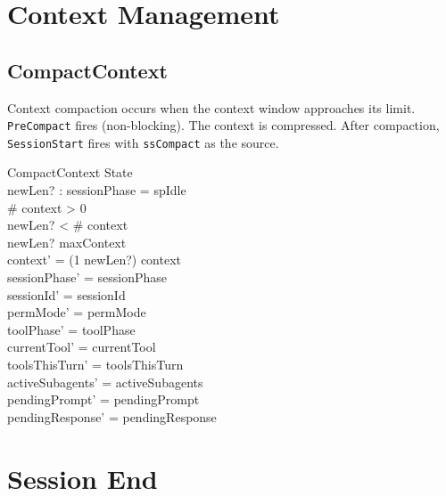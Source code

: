 \documentclass[a4paper,10pt,fleqn]{article}
\begin{document}
\section{Context Management}

\subsection{CompactContext}

Context compaction occurs when the context window approaches its limit.
\texttt{PreCompact} fires (non-blocking). The context is compressed.
After compaction, \texttt{SessionStart} fires with \texttt{ssCompact}
as the source.

\begin{schema}{CompactContext}
  \Delta State \\
  newLen? : \nat
  \where
  sessionPhase = spIdle \\
  \# context > 0 \\
  newLen? < \# context \\
  newLen? \leq maxContext \\
  context' = (1 \upto newLen?) \dres context \\
  sessionPhase' = sessionPhase \\
  sessionId' = sessionId \\
  permMode' = permMode \\
  toolPhase' = toolPhase \\
  currentTool' = currentTool \\
  toolsThisTurn' = toolsThisTurn \\
  activeSubagents' = activeSubagents \\
  pendingPrompt' = pendingPrompt \\
  pendingResponse' = pendingResponse
\end{schema}

\section{Session End}

\end{document}
